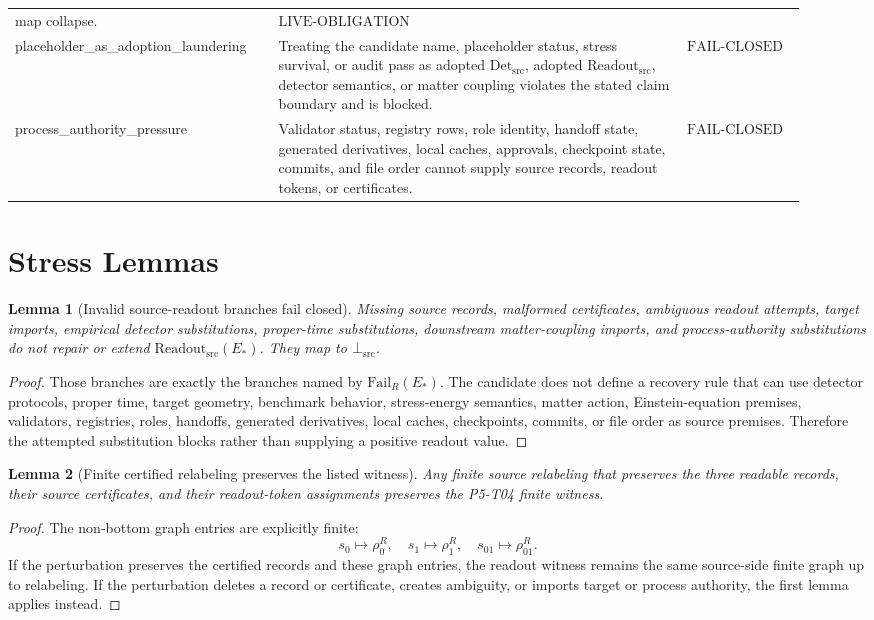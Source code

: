 \documentclass[11pt]{article}
\newcommand{\EStar}{E_{\ast}}
\newcommand{\ReadoutSrc}{\mathrm{Readout}_{\mathrm{src}}}
\newcommand{\DetSrc}{\mathrm{Det}_{\mathrm{src}}}
\newcommand{\FailR}{\mathrm{Fail}_{R}}
\newcommand{\BottomSrc}{\bot_{\mathrm{src}}}
\newcommand{\FailClosed}{\mathrm{FAIL}\mbox{-}\mathrm{CLOSED}}
\newcommand{\LiveObligation}{\mathrm{LIVE}\mbox{-}\mathrm{OBLIGATION}}
\newtheorem{lemma}{Lemma}
\begin{document}
\begin{longtable}{p{0.30\linewidth}p{0.48\linewidth}p{0.14\linewidth}}
map collapse. & \(\LiveObligation\) \\
placeholder\_as\_adoption\_laundering &
Treating the candidate name, placeholder status, stress survival, or audit
pass as adopted \(\DetSrc\), adopted \(\ReadoutSrc\), detector semantics, or
matter coupling violates the stated claim boundary and is blocked. &
\(\FailClosed\) \\
process\_authority\_pressure &
Validator status, registry rows, role identity, handoff state, generated
derivatives, local caches, approvals, checkpoint state, commits, and file
order cannot supply source records, readout tokens, or certificates. &
\(\FailClosed\) \\
\bottomrule
\end{longtable}

\section{Stress Lemmas}

\begin{lemma}[Invalid source-readout branches fail closed]
Missing source records, malformed certificates, ambiguous readout attempts,
target imports, empirical detector substitutions, proper-time substitutions,
downstream matter-coupling imports, and process-authority substitutions do
not repair or extend \(\ReadoutSrc(\EStar)\). They map to \(\BottomSrc\).
\end{lemma}

\begin{proof}
Those branches are exactly the branches named by \(\FailR(\EStar)\). The
candidate does not define a recovery rule that can use detector protocols,
proper time, target geometry, benchmark behavior, stress-energy semantics,
matter action, Einstein-equation premises, validators, registries, roles,
handoffs, generated derivatives, local caches, checkpoints, commits, or file
order as source premises. Therefore the attempted substitution blocks rather
than supplying a positive readout value.
\end{proof}

\begin{lemma}[Finite certified relabeling preserves the listed witness]
Any finite source relabeling that preserves the three readable records, their
source certificates, and their readout-token assignments preserves the
P5-T04 finite witness.
\end{lemma}

\begin{proof}
The non-bottom graph entries are explicitly finite:
\[
  s_0\mapsto \rho^R_0,\quad
  s_1\mapsto \rho^R_1,\quad
  s_{01}\mapsto \rho^R_{01}.
\]
If the perturbation preserves the certified records and these graph entries,
the readout witness remains the same source-side finite graph up to relabeling.
If the perturbation deletes a record or certificate, creates ambiguity, or
imports target or process authority, the first lemma applies instead.
\end{proof}
\end{document}
